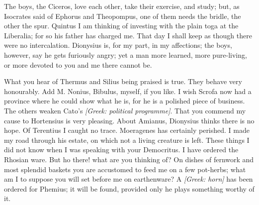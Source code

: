  The boys, the Ciceros, love each other, take their exercise, and study; but, as Isocrates said of Ephorus and Theopompus, one of them needs the bridle, the other the spur. Quintus I am thinking of investing with the plain toga at the Liberalia; for so his father has charged me. That day I shall keep as though there were no intercalation. Dionysius is, for my part, in my affections; the boys, however, say he gets furiously angry; yet a man more learned, more pure-living, or more devoted to you and me there cannot be.

 What you hear of Thermus and Silius being praised is true. They behave very honourably. Add M. Nonius, Bibulus, myself, if you like. I wish Scrofa now had a province where he could show what he is, for he is a polished piece of business. The others weaken Cato's \textit{[Greek: political programme]}. That you commend my cause to Hortensius is very pleasing. About Amianus, Dionysius thinks there is no hope. Of Terentius I caught no trace. Moeragenes has certainly perished. I made my road through his estate, on which not a living creature is left. These things I did not know when I was speaking with your Democritus. I have ordered the Rhosian ware. But ho there! what are you thinking of? On dishes of fernwork and most splendid baskets you are accustomed to feed me on a few pot-herbs; what am I to suppose you will set before me on earthenware? A \textit{[Greek: horn]} has been ordered for Phemius; it will be found, provided only he plays something worthy of it.

